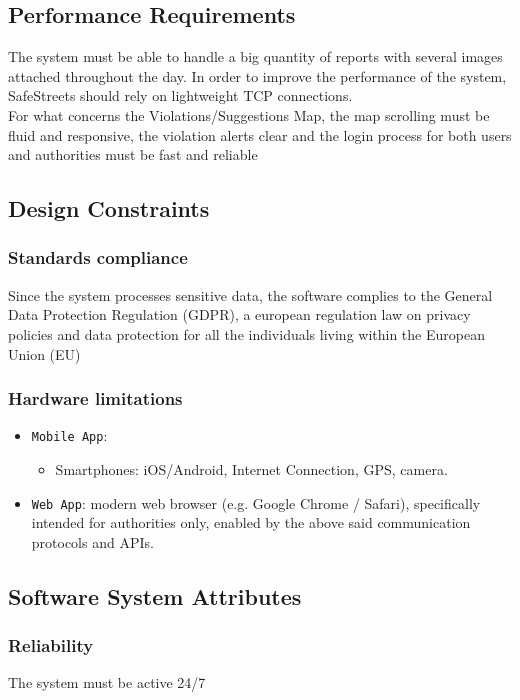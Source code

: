 \documentclass[12pt,a4paper]{article}
\begin{document}
\subsection{Performance Requirements}
	The system must be able to handle a big quantity of reports with several images attached throughout the day. In order to improve the performance of the system, SafeStreets should rely on lightweight TCP connections.\\
	For what concerns the Violations/Suggestions Map, the map scrolling must be fluid and responsive, the violation alerts clear and the login process for both users and authorities must be fast and reliable
\subsection{Design Constraints}
\subsubsection{Standards compliance}
Since the system processes sensitive data, the software complies to the General Data Protection Regulation (GDPR), a european regulation law on privacy policies and data protection for all the individuals living within the European Union (EU)
\subsubsection{Hardware limitations}
	\begin{itemize}
			\item \texttt{Mobile App}: 
				\begin{itemize}
					\item Smartphones: iOS/Android, Internet Connection, GPS, camera.
				\end{itemize}
			\item \texttt{Web App}: modern web browser (e.g. Google Chrome / Safari), specifically intended for authorities only, enabled by the above said communication protocols and APIs.
		\end{itemize}
\subsection{Software System Attributes} 
\subsubsection{Reliability}
The system must be active 24/7
\end{document}
